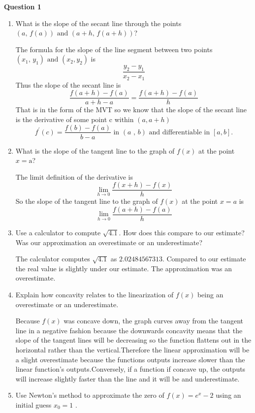 \documentclass{article}
\begin{document}
\begin{center}
\textbf{Question 1}
\end{center}

\begin{enumerate}[label=\textbf{WS \arabic*}]

\item What is the slope of the secant line through the points $(a\text{, } f(a)) \text{ and } (a+h\text{, } f(a+h))$?

The formula for the slope of the line segment between two points $(x_1\text{, } y_1) \text{ and } (x_2, y_2)$ is
\[\frac{y_2-y_1}{x_2-x_1}\]
Thus the slope of the secant line is
\[\frac{f(a+h)-f(a)}{a+h-a}=\frac{f(a+h)-f(a)}{h}\]
That is in the form of the MVT so we know that the slope of the secant line is the derivative of some point c within $(a,a+h)$
\[f^\prime(c)=\frac{f(b)-f(a)}{b-a} \text{ in } (a\text{ , }b)\text{ and differentiable in } [a,b]\text{.}\]

\item What is the slope of the tangent line to the graph
of $f(x)$ at the point $x=\text{a}$?

 The limit definition of the derivative is
\[\lim_{h \to 0} {\frac{f(x+h)-f(x)}{h}}\]
So the slope of the tangent line to the graph of $f(x)$ at the point $x=a$ is
\[\lim_{h \to 0} {\frac{f(a+h)-f(a)}{h}}\]

\item Use a calculator to compute $\sqrt{4.1}$. How does this compare to our estimate? Was our approximation an overestimate or an underestimate?

The calculator computes $\sqrt{4.1}$ as $2.02484567313$. Compared to our estimate the real value is slightly under our estimate. The approximation was an overestimate.

\item Explain how concavity relates to the linearization of $f(x)$ being an overestimate or an underestimate.

Because $f(x)$ was concave down, the graph curves away from the tangent line in a negative fashion because the downwards concavity means that the slope of the tangent lines will be decreasing so the function flattens out in the horizontal rather than the vertical.Therefore the linear approximation will be a slight overestimate because the functions outputs increase slower than the linear function's outputs.Conversely, if a function if concave up, the outputs will increase slightly faster than the line and it will be and underestimate.
\item Use Newton's method to approximate the zero of
$f(x) = e^x - 2$ using an initial guess $x_\text{0}=1$ .


\end{enumerate}
\end{document}
